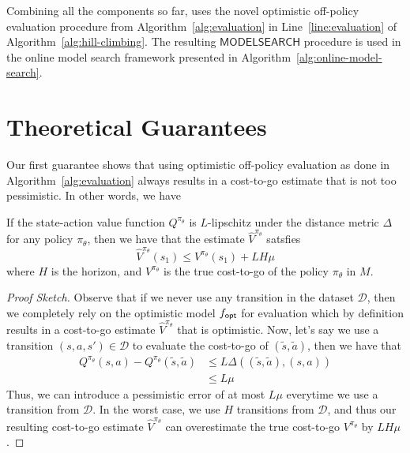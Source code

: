 Combining all the components so far, \taml{} uses the novel optimistic
off-policy evaluation procedure from Algorithm~\ref{alg:evaluation} in
Line~\ref{line:evaluation} of Algorithm~\ref{alg:hill-climbing}. The
resulting $\mathsf{MODELSEARCH}$ procedure is used in the online model
search framework presented in Algorithm~\ref{alg:online-model-search}.

\section{Theoretical Guarantees}
\label{sec:theor-guar}

Our first guarantee shows that using optimistic off-policy evaluation
as done in Algorithm~\ref{alg:evaluation} always results in a
cost-to-go estimate that is not too pessimistic. In other words, we
have
\begin{theorem}
  If the state-action value function $Q^{\pi_\theta}$ is $L$-lipschitz
  under the 
  distance metric $\Delta$ for any policy $\pi_\theta$, then we have
  that the estimate $\hat{V}^{\pi_\theta}$ satsfies
  \begin{equation}
    \label{eq:25}
    \hat{V}^{\pi_\theta}(s_1) \leq V^{\pi_\theta}(s_1) + LH\mu
  \end{equation}
  where $H$ is the horizon, and $V^{\pi_\theta}$ is the true
  cost-to-go of the policy $\pi_\theta$ in $M$.
  \label{theorem:lipschitz}
\end{theorem}
\begin{proof}[Proof Sketch]
  Observe that if we never use any transition in the dataset
  $\mathcal{D}$, then we completely rely on the optimistic model
  $f_\mathsf{opt}$ for evaluation which by definition results in a cost-to-go
  estimate $\hat{V}^{\pi_\theta}$ that is optimistic. Now, let's say
  we use a transition $(s, a, s') \in \mathcal{D}$ to evaluate the
  cost-to-go of $(\tilde{s}, \tilde{a})$, then we have that
  \begin{align*}
    Q^{\pi_\theta}(s, a) - Q^{\pi_\theta}(\tilde{s}, \tilde{a}) &\leq L\Delta((\tilde{s},
                              \tilde{a}), (s, a)) \\
    &\leq L\mu
  \end{align*}
  Thus, we can introduce a pessimistic error of at most $L\mu$
  everytime we use a transition from $\mathcal{D}$. In the worst case,
  we use $H$ transitions from $\mathcal{D}$, and thus our resulting
  cost-to-go estimate $\hat{V}^{\pi_\theta}$ can overestimate the true
  cost-to-go $V^{\pi_\theta}$ by $LH\mu$.
\end{proof}

